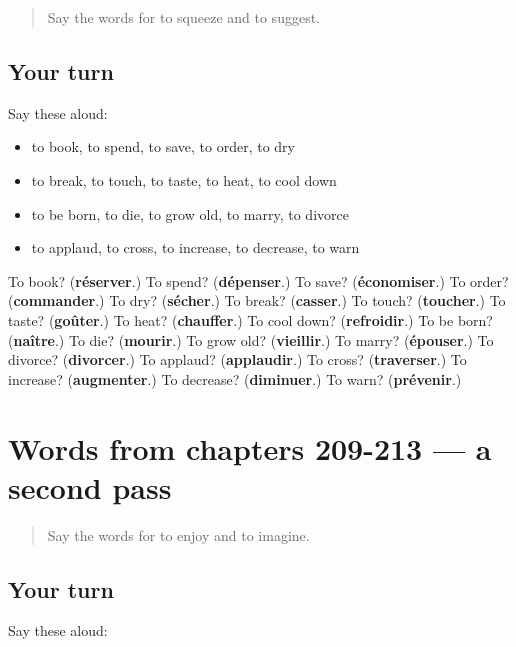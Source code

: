 \label{lesson:FR-R213-first-pass-words-from-chapters-205-208}



\begin{quote}
Say the words for to squeeze and to suggest.
\end{quote}

\subsection*{Your turn}
Say these aloud:

\begin{itemize}
\raggedright
  \item to book, to spend, to save, to order, to dry
  \item to break, to touch, to taste, to heat, to cool down
  \item to be born, to die, to grow old, to marry, to divorce
  \item to applaud, to cross, to increase, to decrease, to warn
\end{itemize}

\begin{tcolorbox}[breakable,colback=teal!4,colframe=teal!35!black,title={Before you move on}]
To book? (\textbf{réserver}.) To spend? (\textbf{dépenser}.) To save? (\textbf{économiser}.) To order? (\textbf{commander}.) To dry? (\textbf{sécher}.) To break? (\textbf{casser}.) To touch? (\textbf{toucher}.) To taste? (\textbf{goûter}.) To heat? (\textbf{chauffer}.) To cool down? (\textbf{refroidir}.) To be born? (\textbf{naître}.) To die? (\textbf{mourir}.) To grow old? (\textbf{vieillir}.) To marry? (\textbf{épouser}.) To divorce? (\textbf{divorcer}.) To applaud? (\textbf{applaudir}.) To cross? (\textbf{traverser}.) To increase? (\textbf{augmenter}.) To decrease? (\textbf{diminuer}.) To warn? (\textbf{prévenir}.)
\end{tcolorbox}
\section[(dialogue)]{Words from chapters 209-213 — a second pass}

\label{lesson:FR-R213-second-pass-words-from-chapters-209-213}



\begin{quote}
Say the words for to enjoy and to imagine.
\end{quote}

\subsection*{Your turn}
Say these aloud:

